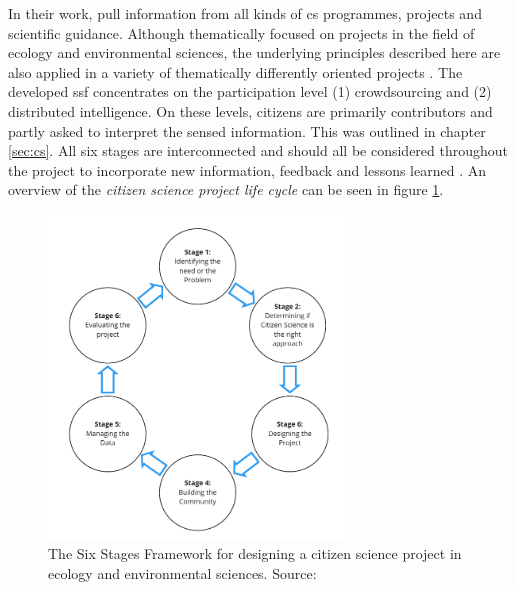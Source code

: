 In their work, \textcite{fraislCitizenScienceEnvironmental2022} pull information from all kinds of \acrshort{cs} programmes, projects and scientific guidance. Although thematically focused on projects in the field of ecology and environmental sciences, the underlying principles described here are also applied in a variety of thematically differently oriented projects \autocite{fraislCitizenScienceEnvironmental2022}. The developed \acrfull{ssf} concentrates on the participation level (1) crowdsourcing and (2) distributed intelligence. On these levels, citizens are primarily contributors and partly asked to interpret the sensed information. This was outlined in chapter \ref{sec:cs}. All six stages are interconnected and should all be considered throughout the project to incorporate new information, feedback and lessons learned \autocite{fraislCitizenScienceEnvironmental2022}. An overview of the \textit{citizen science project life cycle} can be seen in figure \ref{fig:meth_ssf}.

\begin{figure}[!htp]
    \centering
    \includegraphics[width=0.7\textwidth]{figures/2023_MA_methods_ssf_original.pdf}
    \decoRule
    \caption[The Six Stages Framework]{The Six Stages Framework for designing a citizen science project in ecology and environmental sciences. Source: \autocite[4]{fraislCitizenScienceEnvironmental2022}}
    \label{fig:meth_ssf}
\end{figure}

